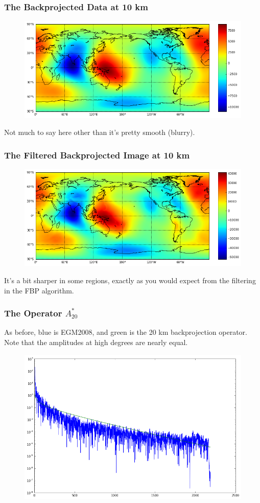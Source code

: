 \documentclass[aspectratio=43,mathserif]{beamer}
\begin{document}
\begin{frame}
\frametitle{The Backprojected Data at 10 km}

\begin{figure}
\includegraphics[width=0.9\linewidth]{BP10.png}
\end{figure}

Not much to say here other than it's pretty smooth (blurry).
\end{frame}
\begin{frame}

\frametitle{The Filtered Backprojected Image at 10 km}

\begin{figure}
\includegraphics[width=0.9\linewidth]{FBP10.png}
\end{figure}

It's a bit sharper in some regions, exactly as you would expect from the filtering in the FBP algorithm.
\end{frame}

\begin{frame}
\frametitle{The Operator \(A_{20}^*\)}

As before, blue is EGM2008, and green is the 20 km backprojection operator. Note that the amplitudes at high degrees are nearly equal.

\begin{figure}
\includegraphics[width=0.65\linewidth]{1_r_20.png}
\end{figure}
\end{frame}
\end{document}
